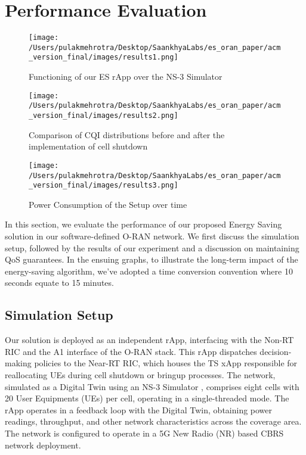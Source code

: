 \section{Performance Evaluation}
\label{sec:results}

\begin{figure*}[ht]
  \centering
  \begin{minipage}{.33\textwidth}
    \centering
    \texttt{[image: /Users/pulakmehrotra/Desktop/SaankhyaLabs/es\_oran\_paper/acm\_version\_final/images/results1.png]}
    \caption{Functioning of our ES rApp over the NS-3 Simulator}
    \label{fig:r1}
  \end{minipage} %
  \begin{minipage}{.33\textwidth}
    \centering
    \texttt{[image: /Users/pulakmehrotra/Desktop/SaankhyaLabs/es\_oran\_paper/acm\_version\_final/images/results2.png]}
    \caption{Comparison of CQI distributions before and after the implementation of cell shutdown}
    \label{fig:r2}
  \end{minipage}%
  \begin{minipage}{.33\textwidth}
    \centering
    \texttt{[image: /Users/pulakmehrotra/Desktop/SaankhyaLabs/es\_oran\_paper/acm\_version\_final/images/results3.png]}
    \caption{Power Consumption of the Setup over time}
    \label{fig:r3}
  \end{minipage}
\end{figure*}

In this section, we evaluate the performance of our proposed Energy Saving solution in our software-defined O-RAN network. 
We first discuss the simulation setup, followed by the results of our experiment and a discussion on maintaining QoS guarantees.
In the ensuing graphs, to illustrate the long-term impact of the energy-saving algorithm, we've adopted a time conversion convention where 10 seconds equate to 15 minutes. 

\subsection{Simulation Setup}
Our solution is deployed as an independent rApp, interfacing with the Non-RT RIC and the A1 interface of the O-RAN stack. 
This rApp dispatches decision-making policies to the Near-RT RIC, which houses the TS xApp responsible for reallocating UEs during cell shutdown or bringup processes.
The network, simulated as a Digital Twin using an NS-3 Simulator \cite{ns3}, comprises eight cells with 20 User Equipments (UEs) per cell, operating in a single-threaded mode.
The rApp operates in a feedback loop with the Digital Twin, obtaining power readings, throughput, and other network characteristics across the coverage area.
The network is configured to operate in a 5G New Radio (NR) based CBRS network deployment.

